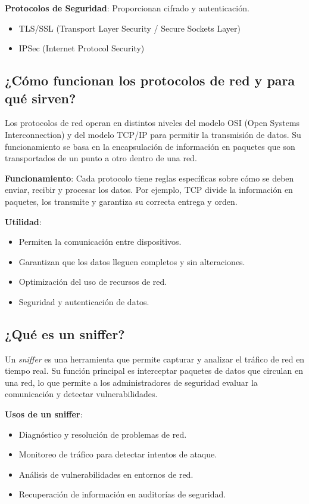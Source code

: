 \textbf{Protocolos de Seguridad}: Proporcionan cifrado y autenticación.
\begin{itemize}
    \item TLS/SSL (Transport Layer Security / Secure Sockets Layer)
    \item IPSec (Internet Protocol Security)
\end{itemize}

\subsection{¿Cómo funcionan los protocolos de red y para qué sirven?}
Los protocolos de red operan en distintos niveles del modelo OSI (Open Systems Interconnection) y del modelo TCP/IP para permitir la transmisión de datos. Su funcionamiento se basa en la encapsulación de información en paquetes que son transportados de un punto a otro dentro de una red.

\textbf{Funcionamiento}: Cada protocolo tiene reglas específicas sobre cómo se deben enviar, recibir y procesar los datos. Por ejemplo, TCP divide la información en paquetes, los transmite y garantiza su correcta entrega y orden.

\textbf{Utilidad}:
\begin{itemize}
    \item Permiten la comunicación entre dispositivos.
    \item Garantizan que los datos lleguen completos y sin alteraciones.
    \item Optimización del uso de recursos de red.
    \item Seguridad y autenticación de datos.
\end{itemize}

\subsection{¿Qué es un sniffer?}
Un \textit{sniffer} es una herramienta que permite capturar y analizar el tráfico de red en tiempo real. Su función principal es interceptar paquetes de datos que circulan en una red, lo que permite a los administradores de seguridad evaluar la comunicación y detectar vulnerabilidades.

\textbf{Usos de un sniffer}:
\begin{itemize}
    \item Diagnóstico y resolución de problemas de red.
    \item Monitoreo de tráfico para detectar intentos de ataque.
    \item Análisis de vulnerabilidades en entornos de red.
    \item Recuperación de información en auditorías de seguridad.
\end{itemize}

